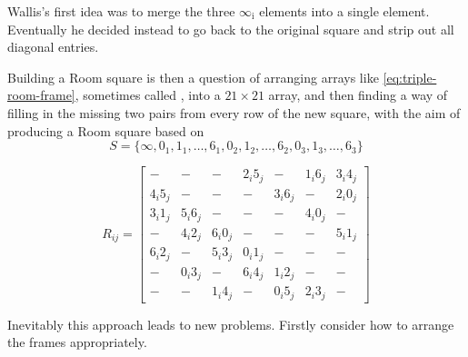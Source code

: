 Wallis's first idea was to merge the three $\infty _\mathrm{i}$ elements into a single element.
Eventually he decided instead to go back to the original square and strip out all diagonal entries.

Building a Room square is then a question of arranging arrays like \eqref{eq:triple-room-frame}, sometimes called , into a $21 \times 21$ array, and then finding a way of filling in the missing two pairs from every row of the new square, with the aim of producing a Room square based on
\begin{equation*}
  S = \{\infty, 0_{1}, 1_{1}, \ldots, 6_{1}, 0_{2}, 1_{2}, \ldots, 6_{2}, 0_{3}, 1_{3}, \ldots, 6_{3}\}
\end{equation*}

\begin{equation}
  R_{ij} = \begin{bmatrix}
             - &           - &           - &  2_{i}5_{j} &           - &  1_{i}6_{j} &  3_{i}4_{j} \\
    4_{i}5_{j} &           - &           - &           - &  3_{i}6_{j} &           - &  2_{i}0_{j} \\
    3_{i}1_{j} &  5_{i}6_{j} &           - &           - &           - &  4_{i}0_{j} &           - \\
             - &  4_{i}2_{j} &  6_{i}0_{j} &           - &           - &           - &  5_{i}1_{j} \\
    6_{i}2_{j} &           - &  5_{i}3_{j} &  0_{i}1_{j} &           - &           - &           - \\
             - &  0_{i}3_{j} &           - &  6_{i}4_{j} &  1_{i}2_{j} &           - &           - \\
             - &           - &  1_{i}4_{j} &           - &  0_{i}5_{j} &  2_{i}3_{j} &           - 
  \end{bmatrix}
  \label{eq:triple-room-frame}
\end{equation}

Inevitably this approach leads to new problems.
Firstly consider how to arrange the frames appropriately.

